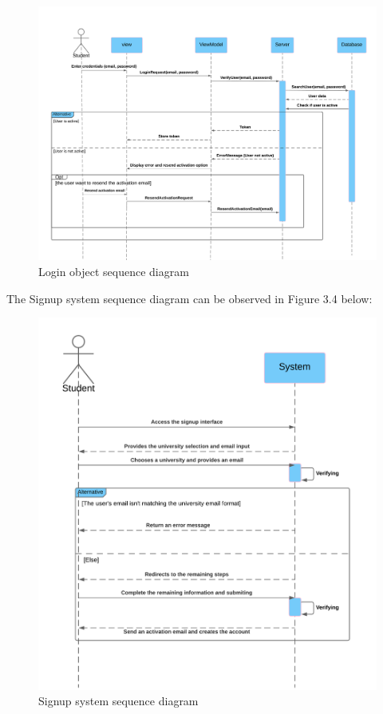\begin{figure}[H] 
            \centering
            \includegraphics[scale=0.4]{diagrams/object seq diagram login.png}
            \caption{Login object sequence diagram} 
            \label{fig: Login object sequence diagram}
\end{figure}

The Signup system sequence diagram can be observed in Figure 3.4 below:

\begin{figure}[H] 
            \centering
            \includegraphics[scale=0.5]{diagrams/system seq diagram signup.png}
            \caption{Signup system sequence diagram} 
            \label{fig: Signup system sequence diagram}
\end{figure}

